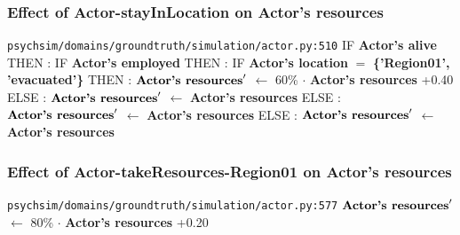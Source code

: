 \documentclass{article}%
\begin{document}
\subsubsection{Effect of Actor{-}stayInLocation on Actor's resources}%
\label{ssubsec:Effect of Actor{-}stayInLocation on Actor's resources}%
\begin{flushleft}%
\verb|psychsim/domains/groundtruth/simulation/actor.py:510|%
\linebreak%
IF %
\textbf{Actor's alive}%
\linebreak%
\hspace*{2em}%
THEN %
: %
IF %
\textbf{Actor's employed}%
\linebreak%
\hspace*{4em}%
THEN %
: %
IF %
\textbf{Actor's location}%
$=$%
\textbf{\{'Region01', 'evacuated'\}}%
\linebreak%
\hspace*{6em}%
THEN %
: %
$\mbox{\textbf{Actor's resources}} '$%
$\leftarrow$%
60\%%
$\cdot$%
\textbf{Actor's resources}%
+0.40%
\linebreak%
\hspace*{6em}%
ELSE %
: %
$\mbox{\textbf{Actor's resources}} '$%
$\leftarrow$%
\textbf{Actor's resources}%
\linebreak%
\hspace*{4em}%
ELSE %
: %
$\mbox{\textbf{Actor's resources}} '$%
$\leftarrow$%
\textbf{Actor's resources}%
\linebreak%
\hspace*{2em}%
ELSE %
: %
$\mbox{\textbf{Actor's resources}} '$%
$\leftarrow$%
\textbf{Actor's resources}%
\end{flushleft}

%
\subsubsection{Effect of Actor{-}takeResources{-}Region01 on Actor's resources}%
\label{ssubsec:Effect of Actor{-}takeResources{-}Region01 on Actor's resources}%
\begin{flushleft}%
\verb|psychsim/domains/groundtruth/simulation/actor.py:577|%
\linebreak%
$\mbox{\textbf{Actor's resources}} '$%
$\leftarrow$%
80\%%
$\cdot$%
\textbf{Actor's resources}%
+0.20%
\end{flushleft}

%
\end{document}
